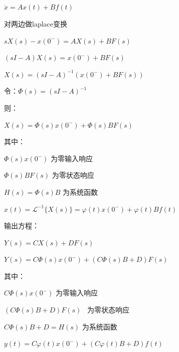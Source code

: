 \documentclass[UTF8]{ctexart}
\begin{document}
\subsection{ }
$\dot{x} = Ax(t)+ Bf(t)$\par
对两边做laplace变换 \par
$ sX(s)-x(0^-)=AX(s)+BF(s) $ \par
$ (sI-A)X(s)=x(0^-)+BF(s) $ \par
$ X(s)=(sI-A)^{-1}(x(0^-)+BF(s)) $ \par
令：$ \Phi (s)=(sI-A)^{-1} $ \par
则：\par
\qquad $X(s)= \Phi (s)x(0^-)+\Phi (s)BF(s) $ \par
其中：\par
$\Phi (s)x(0^-)$ \qquad \qquad  为零输入响应 \par
$\Phi (s)BF(s) $ \qquad \qquad  为零状态响应 \par
$H(s)= \Phi (s)B $ \qquad \; 为系统函数 \par
$x(t)=\mathscr{L}^{-1}\{X(s)\}= \varphi (t)x(0^-)+\varphi (t)Bf(t) $  \par
输出方程：\par
$Y(s)=CX(s)+DF(s)$ \par
$Y(s)=C\Phi (s)x(0^-)+(C\Phi (s)B+D)F(s) $  \par
其中：\par
$C\Phi (s)x(0^-)$ \qquad \qquad  \quad 为零输入响应 \par
$(C\Phi (s)B+D)F(s) $ \qquad \, 为零状态响应 \par
$C\Phi (s)B+D=H(s) $ \qquad 为系统函数 \par
$y(t)=C\varphi (t)x(0^-)+(C\varphi (t)B+D)f(t) $  \par
\end{document}
